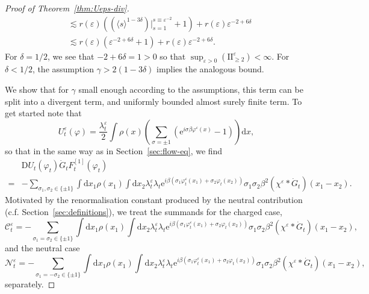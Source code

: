 \documentclass[11pt, a4paper]{scrartcl}
\numberwithin{equation}{section}
\theoremstyle{plain}
\theoremstyle{remark}
\newcommand{\Iota}{\mathrm{I}}
\newcommand{\mathD}{\mathrm{D}}
\newcommand{\mathd}{\mathrm{d}}
\newcommand{\mathe}{\mathrm{e}}
\newcommand{\tmtextbf}[1]{\text{{\bfseries{#1}}}}
\begin{document}
\begin{proof}[Proof of Theorem~\ref{thm:Ueps-div}]
\[\begin{aligned}
			                                          & \lesssim  r (\varepsilon) ((\langle s \rangle^{1 - 3 \delta}) |_{s
					= 1}^{s \equiv \varepsilon^{- 2}} + 1) + r (\varepsilon) \varepsilon^{-
			2 + 6 \delta}                                                                                                   \\
			                                          & \lesssim  r (\varepsilon) (\varepsilon^{- 2 + 6 \delta} + 1) + r
			(\varepsilon) \varepsilon^{- 2 + 6 \delta}.
		\end{aligned} \]
	For $\delta = 1 / 2$, we see that $- 2 + 6 \delta = 1 > 0$ so that
	$\sup_{\varepsilon > 0} (\Iota \Iota^{\varepsilon}_{\geqslant 2}) < \infty$.
	For $\delta < 1 / 2$, the assumption $\gamma > 2 (1 - 3 \delta)$ implies the
	analogous bound.

	\tmtextbf{$(\Iota \Iota^{\varepsilon}_1)$} We show that for $\gamma$ small
	enough according to the assumptions, this term can be split into a divergent
	term, and uniformly bounded almost surely finite term. To get started note
	that
	\[ U^{\varepsilon}_t (\varphi) = \frac{\lambda_t^{\varepsilon}}{2} \int
		\rho (x) \left( \sum_{\sigma = \pm 1} (\mathe^{i \sigma \beta
				\varphi^{\varepsilon} (x)} - 1) \right) \mathd x, \]
	so that in the same way as in Section~\ref{sec:flow-eq}, we find
	\begin{align*}
		  & \mathD U_t (\varphi_t) \dot{G}_t F^{[1]}_t (\varphi_t) \\
		= & -
		\sum_{\sigma_1, \sigma_2 \in \{ \pm 1 \}} \int \mathd x_1 \rho (x_1) \int
		\mathd x_2 \lambda_t^{\varepsilon} \lambda_t \mathe^{i \beta (\sigma_1
			\varphi^{\varepsilon}_t (x_1) + \sigma_2 \varphi_t (x_2))} \sigma_1
		\sigma_2 \beta^2 (\chi^{\varepsilon} \ast \dot{G}_t ) (x_1 - x_2) .
	\end{align*}
	Motivated by the renormalisation constant produced by the neutral
	contribution (c.f. Section~\ref{sec:definitions}), we treat the summands for
	the charged case,
	{\small\[ \mathcal{C}^{\varepsilon}_t = - \sum_{\sigma_1 = \sigma_2 \in \{ \pm 1
					\}} \int \mathd x_1 \rho (x_1) \int \mathd x_2 \lambda_t^{\varepsilon}
				\lambda_t \mathe^{i \beta (\sigma_1 \varphi^{\varepsilon}_t (x_1) +
					\sigma_2 \varphi_t (x_2))} \sigma_1 \sigma_2 \beta^2 (\chi^{\varepsilon}
				\ast \dot{G}_t ) (x_1 - x_2), \]}
	and the neutral case
		{\small\[ \mathcal{N}^{\varepsilon}_t = - \sum_{\sigma_1 = - \sigma_2 \in \{ \pm 1
					\}} \int \mathd x_1 \rho (x_1) \int \mathd x_2 \lambda_t^{\varepsilon}
				\lambda_t \mathe^{i \beta (\sigma_1 \varphi^{\varepsilon}_t (x_1) +
					\sigma_2 \varphi_t (x_2))} \sigma_1 \sigma_2 \beta^2 (\chi^{\varepsilon}
				\ast \dot{G}_t ) (x_1 - x_2), \]}
	separately.


\end{proof}
\end{document}
